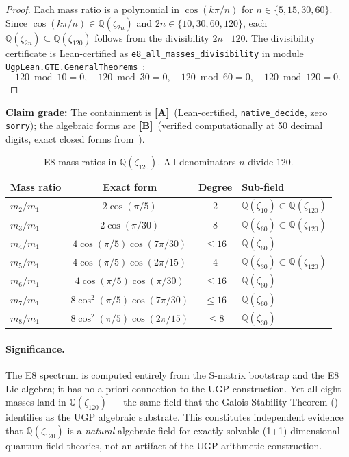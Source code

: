 \documentclass[11pt]{article}
\theoremstyle{remark}
\newcommand{\zetaN}[1]{\zeta_{#1}}
\begin{document}
\begin{proof}
Each mass ratio is a polynomial in $\cos(k\pi/n)$ for $n \in \{5, 15, 30, 60\}$.
Since $\cos(k\pi/n) \in \mathbb{Q}(\zeta_{2n})$ and $2n \in \{10, 30, 60, 120\}$,
each $\mathbb{Q}(\zeta_{2n}) \subseteq \mathbb{Q}(\zetaN{120})$ follows from the
divisibility $2n \mid 120$.
The divisibility certificate is Lean-certified as
\texttt{e8\_all\_masses\_divisibility}
in module \texttt{UgpLean.GTE.GeneralTheorems}~\cite{ugp-lean}:
\[
120 \bmod 10 = 0,\quad
120 \bmod 30 = 0,\quad
120 \bmod 60 = 0,\quad
120 \bmod 120 = 0.
\]
\end{proof}

\noindent
\textbf{Claim grade:} The containment is \textbf{[A]}\ (Lean-certified, \texttt{native\_decide},
zero \texttt{sorry}); the algebraic forms are \textbf{[B]}\ (verified computationally
at 50 decimal digits, exact closed forms from~\cite{Zamolodchikov1989,DelfinoMussardo1995}).

\begin{table}[H]
\centering
\caption{E8 mass ratios in $\mathbb{Q}(\zetaN{120})$.  All denominators $n$ divide $120$.}
\label{tab:e8_galois}
\small
\renewcommand{\arraystretch}{1.1}
\begin{tabular}{lccl}
\toprule
Mass ratio & Exact form & Degree & Sub-field \\
\midrule
$m_2/m_1$ & $2\cos(\pi/5)$ & 2 & $\mathbb{Q}(\zeta_{10}) \subset \mathbb{Q}(\zetaN{120})$ \\
$m_3/m_1$ & $2\cos(\pi/30)$ & 8 & $\mathbb{Q}(\zeta_{60}) \subset \mathbb{Q}(\zetaN{120})$ \\
$m_4/m_1$ & $4\cos(\pi/5)\cos(7\pi/30)$ & $\leq 16$ & $\mathbb{Q}(\zeta_{60})$ \\
$m_5/m_1$ & $4\cos(\pi/5)\cos(2\pi/15)$ & 4 & $\mathbb{Q}(\zeta_{30}) \subset \mathbb{Q}(\zetaN{120})$ \\
$m_6/m_1$ & $4\cos(\pi/5)\cos(\pi/30)$ & $\leq 16$ & $\mathbb{Q}(\zeta_{60})$ \\
$m_7/m_1$ & $8\cos^2(\pi/5)\cos(7\pi/30)$ & $\leq 16$ & $\mathbb{Q}(\zeta_{60})$ \\
$m_8/m_1$ & $8\cos^2(\pi/5)\cos(2\pi/15)$ & $\leq 8$ & $\mathbb{Q}(\zeta_{30})$ \\
\bottomrule
\end{tabular}
\end{table}

\paragraph{Significance.}
The E8 spectrum is computed entirely from the S-matrix bootstrap and the
E8 Lie algebra; it has no a priori connection to the UGP construction.
Yet all eight masses land in $\mathbb{Q}(\zetaN{120})$ — the same field
that the Galois Stability Theorem () identifies as the UGP
algebraic substrate.
This constitutes independent evidence that $\mathbb{Q}(\zetaN{120})$ is a
\emph{natural} algebraic field for exactly-solvable (1+1)-dimensional quantum field
theories, not an artifact of the UGP arithmetic construction.
\end{document}
